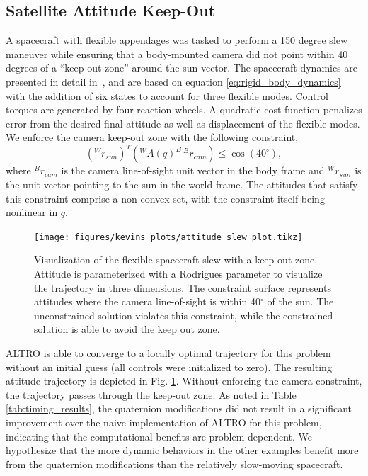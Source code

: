 \documentclass[letterpaper, 10 pt, conference]{ieeeconf}  %
\newcommand{\inframe}[2]{{}^{#1}\!#2}
\newcommand{\toframe}[3]{\inframe{#1}{#3}^{#2}}
\newcommand{\todo}[1]{\textcolor{red}{TODO: #1}}
\begin{document}
    \subsection{Satellite Attitude Keep-Out}
        A spacecraft with flexible appendages was tasked to perform a 150 degree slew maneuver while
        ensuring that a body-mounted camera did not point within 40 degrees of a  ``keep-out zone'' around the sun vector. The spacecraft dynamics are presented in detail in~\cite{Tracy2020}, and are based
        on equation \eqref{eq:rigid_body_dynamics} with the addition of six states to account for three flexible modes. Control torques are generated by four reaction wheels.  A quadratic cost function penalizes error from the desired final attitude as well as displacement of the flexible modes. 
        We enforce the camera keep-out zone with the following constraint,
        \begin{equation}
            \left(\inframe{W}{r_{sun}}\right)^T 
            \left(\toframe{W}{B}{A(q)} \, \inframe{B}{r_{cam}} \right) \leq \cos(40 ^\circ) ,
        \end{equation}
        where $^Br_{cam}$ is the camera line-of-sight unit vector in the body frame and $^Wr_{sun}$ is the unit vector pointing to the sun in the world frame. The attitudes that satisfy this constraint comprise a non-convex set, with the constraint itself being nonlinear in $q$.
        \begin{figure}[ht]
            \centering
            \texttt{[image: figures/kevins\_plots/attitude\_slew\_plot.tikz]}
            \caption{Visualization of the flexible spacecraft slew with a keep-out zone. Attitude is parameterized with a Rodrigues parameter to visualize the trajectory in three dimensions. The constraint surface represents attitudes where the camera line-of-sight is within 40$^\circ$ of the sun. The unconstrained solution violates this constraint, while the constrained solution is able to avoid the keep out zone.}
            \label{fig:keepout}
        \end{figure}
        
        ALTRO is able to converge to a locally optimal trajectory for this problem without an initial guess (all controls were initialized to zero). The resulting attitude trajectory is depicted in Fig. \ref{fig:keepout}. Without enforcing the camera constraint, the trajectory passes through the keep-out zone. As noted in Table \ref{tab:timing_results}, the quaternion modifications did not result in a significant improvement over the naive implementation of ALTRO for this problem, indicating that the computational benefits are problem dependent. We hypothesize that the more dynamic behaviors in the other examples benefit more from the quaternion modifications than the relatively slow-moving spacecraft.
    
\end{document}
